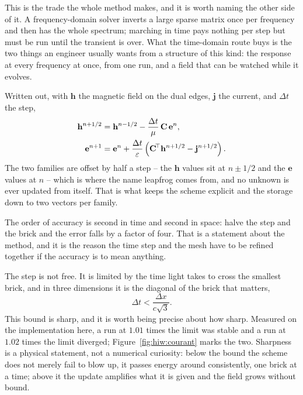 This is the trade the whole method makes, and it is worth naming the other side of it. A frequency-domain solver
inverts a large sparse matrix once per frequency and then has the whole spectrum; marching in time pays nothing
per step but must be run until the transient is over. What the time-domain route buys is the two things an
engineer usually wants from a structure of this kind: the response at every frequency at once, from one run, and
a field that can be watched while it evolves.

Written out, with $\mathbf{h}$ the magnetic field on the dual edges, $\mathbf{j}$ the current, and $\Delta t$ the
step,
\begin{equation}
  \begin{aligned}
    \mathbf{h}^{n+1/2} &= \mathbf{h}^{n-1/2} - \frac{\Delta t}{\mu}\,\mathbf{C}\,\mathbf{e}^{n},\\
    \mathbf{e}^{n+1} &= \mathbf{e}^{n} + \frac{\Delta t}{\varepsilon}\left(\mathbf{C}^{\!\top}\mathbf{h}^{n+1/2}
       - \mathbf{j}^{n+1/2}\right).
  \end{aligned}
  \label{eq:hiw-leapfrog}
\end{equation}
The two families are offset by half a step -- the $\mathbf{h}$ values sit at $n\pm 1/2$ and the $\mathbf{e}$
values at $n$ -- which is where the name leapfrog comes from, and no unknown is ever updated from itself. That
is what keeps the scheme explicit and the storage down to two vectors per family.

The order of accuracy is second in time and second in space: halve the step and the brick and the error falls by
a factor of four. That is a statement about the method, and it is the reason the time step and the mesh have to
be refined together if the accuracy is to mean anything.

The step is not free. It is limited by the time light takes to cross the smallest brick, and in three dimensions
it is the diagonal of the brick that matters,
\begin{equation}
  \Delta t < \frac{\Delta x}{c\sqrt{3}} .
  \label{eq:hiw-courant}
\end{equation}
This bound is sharp, and it is worth being precise about how sharp. Measured on the implementation here, a run at
$1.01$ times the limit was stable and a run at $1.02$ times the limit diverged; Figure~\ref{fig:hiw:courant}
marks the two. Sharpness is a physical statement, not a numerical curiosity: below the bound the scheme does not
merely fail to blow up, it passes energy around consistently, one brick at a time; above it the update amplifies
what it is given and the field grows without bound.

